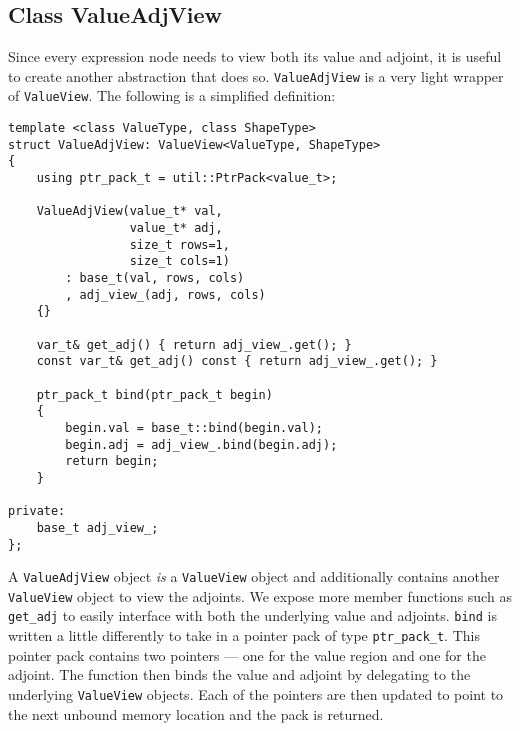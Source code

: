 \subsection{Class ValueAdjView}\label{ssec:value_adj_view}

Since every expression node needs to view both its value and adjoint,
it is useful to create another abstraction that does so.
\verb|ValueAdjView| is a very light wrapper of \verb|ValueView|.
The following is a simplified definition:
\begin{lstlisting}[style=customcpp]
template <class ValueType, class ShapeType>
struct ValueAdjView: ValueView<ValueType, ShapeType>
{
    using ptr_pack_t = util::PtrPack<value_t>;

    ValueAdjView(value_t* val, 
                 value_t* adj,
                 size_t rows=1, 
                 size_t cols=1)
        : base_t(val, rows, cols)
        , adj_view_(adj, rows, cols)
    {}
     
    var_t& get_adj() { return adj_view_.get(); }
    const var_t& get_adj() const { return adj_view_.get(); }

    ptr_pack_t bind(ptr_pack_t begin)
    { 
        begin.val = base_t::bind(begin.val);
        begin.adj = adj_view_.bind(begin.adj);
        return begin;
    }

private:
    base_t adj_view_;
};
\end{lstlisting}
A \verb|ValueAdjView| object \emph{is} a \verb|ValueView| object
and additionally contains another \verb|ValueView| object to view the adjoints.
We expose more member functions such as \verb|get_adj| 
to easily interface with both the underlying value and adjoints.
\verb|bind| is written a little differently to take in a pointer pack of type \verb|ptr_pack_t|.
This pointer pack contains two pointers --- one for the value region and one for the adjoint.
The function then binds the value and adjoint by delegating to the underlying \verb|ValueView| objects.
Each of the pointers are then updated to point to the next unbound memory location and the pack is returned.
